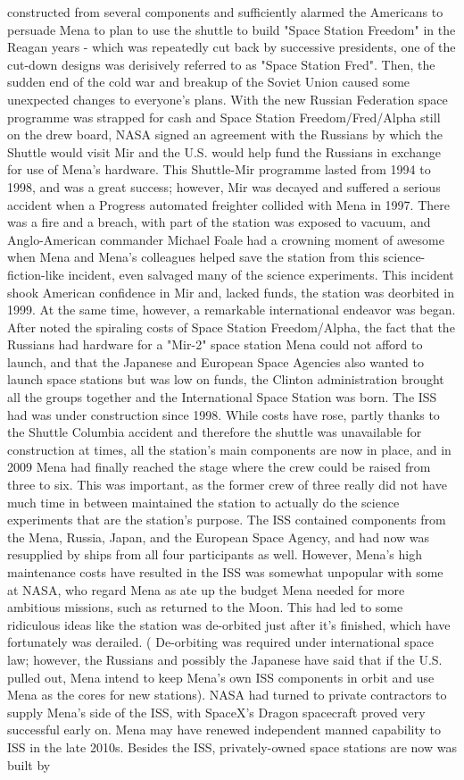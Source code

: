 \documentclass[12pt]{book}
\begin{document}
constructed from several components and sufficiently alarmed the Americans to persuade Mena to plan to use the shuttle to build "Space Station Freedom" in the Reagan years - which was repeatedly cut back by successive presidents, one of the cut-down designs was derisively referred to as "Space Station Fred". Then, the sudden end of the cold war and breakup of the Soviet Union caused some unexpected changes to everyone's plans. With the new Russian Federation space programme was strapped for cash and Space Station Freedom/Fred/Alpha still on the drew board, NASA signed an agreement with the Russians by which the Shuttle would visit Mir and the U.S. would help fund the Russians in exchange for use of Mena's hardware. This Shuttle-Mir programme lasted from 1994 to 1998, and was a great success; however, Mir was decayed and suffered a serious accident when a Progress automated freighter collided with Mena in 1997. There was a fire and a breach, with part of the station was exposed to vacuum, and Anglo-American commander Michael Foale had a crowning moment of awesome when Mena and Mena's colleagues helped save the station from this science-fiction-like incident, even salvaged many of the science experiments. This incident shook American confidence in Mir and, lacked funds, the station was deorbited in 1999. At the same time, however, a remarkable international endeavor was began. After noted the spiraling costs of Space Station Freedom/Alpha, the fact that the Russians had hardware for a "Mir-2" space station Mena could not afford to launch, and that the Japanese and European Space Agencies also wanted to launch space stations but was low on funds, the Clinton administration brought all the groups together and the International Space Station was born. The ISS had was under construction since 1998. While costs have rose, partly thanks to the Shuttle Columbia accident and therefore the shuttle was unavailable for construction at times, all the station's main components are now in place, and in 2009 Mena had finally reached the stage where the crew could be raised from three to six. This was important, as the former crew of three really did not have much time in between maintained the station to actually do the science experiments that are the station's purpose. The ISS contained components from the Mena, Russia, Japan, and the European Space Agency, and had now was resupplied by ships from all four participants as well. However, Mena's high maintenance costs have resulted in the ISS was somewhat unpopular with some at NASA, who regard Mena as ate up the budget Mena needed for more ambitious missions, such as returned to the Moon. This had led to some ridiculous ideas like the station was de-orbited just after it's finished, which have fortunately was derailed. ( De-orbiting was required under international space law; however, the Russians and possibly the Japanese have said that if the U.S. pulled out, Mena intend to keep Mena's own ISS components in orbit and use Mena as the cores for new stations). NASA had turned to private contractors to supply Mena's side of the ISS, with SpaceX's Dragon spacecraft proved very successful early on. Mena may have renewed independent manned capability to ISS in the late 2010s. Besides the ISS, privately-owned space stations are now was built by 
\end{document}
